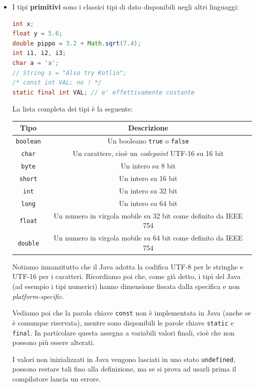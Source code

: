 \documentclass[a4paper,11pt]{article}
\begin{document}
\begin{itemize}
	\item I tipi \textbf{primitivi} sono i classici tipi di dato disponibili negli altri linguaggi:
\begin{lstlisting}[language=java, style=codestyle]	
int x;
float y = 5.6;
double pippo = 3.2 + Math.sqrt(7.4);
int i1, i2, i3;
char a = 'a';
// String s = "Also try Kotlin";
/* const int VAL; no ! */ 
static final int VAL; // e' effettivamente costante
\end{lstlisting}
La lista completa dei tipi è la seguente:
	\begin{table}[H]
		\center {}
		\begin{tabular} { c | c }
			\bfseries Tipo & \bfseries Descrizione \\
			\hline
			\lstinline|boolean| & Un booleano \lstinline|true| o \lstinline|false| \\ 
			\lstinline|char| & Un carattere, cioè un \textit{codepoint} UTF-16 su 16 bit \\ 
			\lstinline|byte| & Un intero su 8 bit \\ 
			\lstinline|short| & Un intero su 16 bit \\ 
			\lstinline|int| & Un intero su 32 bit \\ 
			\lstinline|long| & Un intero su 64 bit \\ 
			\lstinline|float| & Un numero in virgola mobile su 32 bit come definito da IEEE 754 \\ 
			\lstinline|double| & Un numero in virgola mobile su 64 bit come definito da IEEE 754 \\ 
		\end{tabular}
	\end{table}
		Notiamo innanzitutto che il Java adotta la codifica UTF-8 per le stringhe e UTF-16 per i caratteri. Ricordiamo poi che, come già detto, i tipi del Java (ad esempio i tipi numerici) hanno dimensione fissata dalla specifica e non \textit{platform-specific}.

	Vediamo poi che la parola chiave \lstinline|const| non è implementata in Java (anche se è comunque riservata), mentre sono disponibili le parole chiave \lstinline|static| e \lstinline|final|. In particolare questa assegna a variabili valori finali, cioè che non possono più essere alterati.

	I valori non inizializzati in Java vengono lasciati in uno stato \lstinline|undefined|, possono restare tali fino alla definizione, ma se si prova ad usarli prima il compilatore lancia un errore.


\end{itemize}
\end{document}
